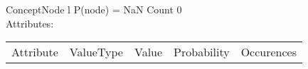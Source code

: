 
 
ConceptNode l \hspace{1cm} P(node) = NaN \hspace{1cm} Count 0
\\ Attributes: \\ 
 \begin{tabular}{|c|c|c|c|c|} \hline 
Attribute & ValueType & Value & Probability & Occurences \hline 
\end{tabular}

